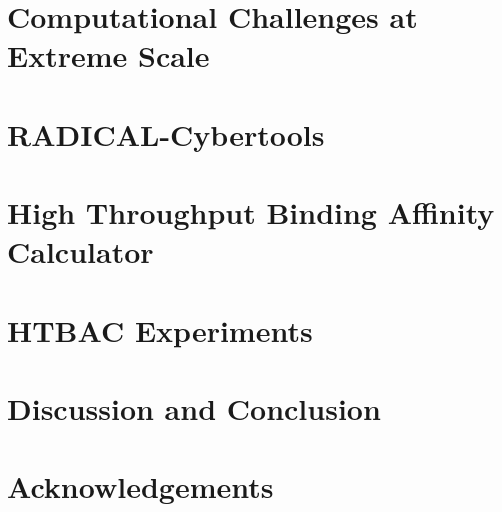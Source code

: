 \documentclass[conference]{IEEEtran}
\begin{document}
\section{Computational Challenges at Extreme Scale}\label{sec:3}



\section{RADICAL-Cybertools}\label{sec:4}




\section{High Throughput Binding Affinity Calculator}\label{sec:htbac}



\section{HTBAC Experiments}\label{sec:6}



\section{Discussion and Conclusion}\label{sec:conclusion}



\section*{Acknowledgements}





\end{document}
